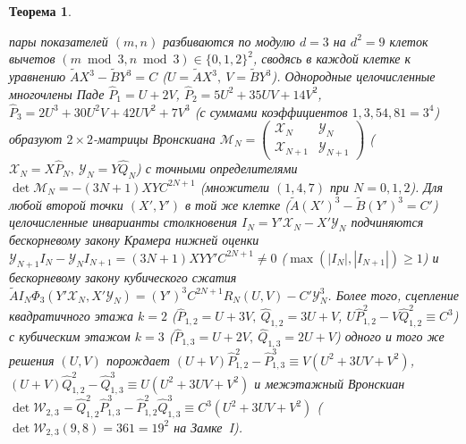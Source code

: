 \documentclass[11pt,a4paper]{article}
\theoremstyle{plain}
\newtheorem{theorem}{Теорема}[section]
\theoremstyle{definition}
\begin{document}
\begin{theorem}
\begin{enumerate}[label=\textbf{(\roman*)},leftmargin=*]
  пары показателей $(m,n)$ разбиваются по модулю $d=3$ на $d^2=9$ клеток вычетов $(m\bmod 3,n\bmod 3)\in\{0,1,2\}^2$, сводясь в каждой клетке к уравнению $\widetilde{A} X^3 - \widetilde{B} Y^3 = C$ ($U = \widetilde{A} X^3,\ V = \widetilde{B} Y^3$). Однородные целочисленные многочлены Паде $\widehat{P}_1 = U + 2V$, $\widehat{P}_2 = 5U^2 + 35UV + 14V^2$, $\widehat{P}_3 = 2U^3 + 30U^2V + 42UV^2 + 7V^3$ (с суммами коэффициентов $1, 3, 54, 81 = 3^4$) образуют $2\times 2$-матрицы Вронскиана $\mathcal{M}_N = \begin{pmatrix} \mathcal{X}_N & \mathcal{Y}_N \\ \mathcal{X}_{N+1} & \mathcal{Y}_{N+1} \end{pmatrix}$ ($\mathcal{X}_N = X\widehat{P}_N,\ \mathcal{Y}_N = Y\widehat{Q}_N$) с точными определителями $\det\mathcal{M}_N = -(3N+1) X Y C^{2N+1}$ (множители $(1, 4, 7)$ при $N = 0, 1, 2$). Для любой второй точки $(X',Y')$ в той же клетке ($\widetilde{A}(X')^3 - \widetilde{B}(Y')^3 = C'$) целочисленные инварианты столкновения $I_N = Y'\mathcal{X}_N - X'\mathcal{Y}_N$ подчиняются бескорневому закону Крамера нижней оценки $\mathcal{Y}_{N+1} I_N - \mathcal{Y}_N I_{N+1} = (3N+1) X Y Y' C^{2N+1}\ne 0$ ($\max(|I_N|,|I_{N+1}|)\ge 1$) и бескорневому закону кубического сжатия $\widetilde{A} I_N \Phi_3(Y'\mathcal{X}_N, X'\mathcal{Y}_N) = (Y')^3 C^{2N+1} R_N(U,V) - C'\mathcal{Y}_N^3$. Более того, сцепление квадратичного этажа $k=2$ ($\widehat{P}_{1,2} = U+3V,\ \widehat{Q}_{1,2} = 3U+V$, $U\widehat{P}_{1,2}^2 - V\widehat{Q}_{1,2}^2 \equiv C^3$) с кубическим этажом $k=3$ ($\widehat{P}_{1,3} = U+2V,\ \widehat{Q}_{1,3} = 2U+V$) одного и того же решения $(U,V)$ порождает $(U+V)\widehat{P}_{1,2}^2 - \widehat{P}_{1,3}^3 \equiv V(U^2+3UV+V^2)$, $(U+V)\widehat{Q}_{1,2}^2 - \widehat{Q}_{1,3}^3 \equiv U(U^2+3UV+V^2)$ и межэтажный Вронскиан $\det\mathcal{W}_{2,3} = \widehat{Q}_{1,2}^2\widehat{P}_{1,3}^3 - \widehat{P}_{1,2}^2\widehat{Q}_{1,3}^3 \equiv C^3(U^2+3UV+V^2)$ ($\det\mathcal{W}_{2,3}(9,8) = 361 = 19^2$ на Замке~I).
\end{enumerate}
\end{theorem}
\end{document}
